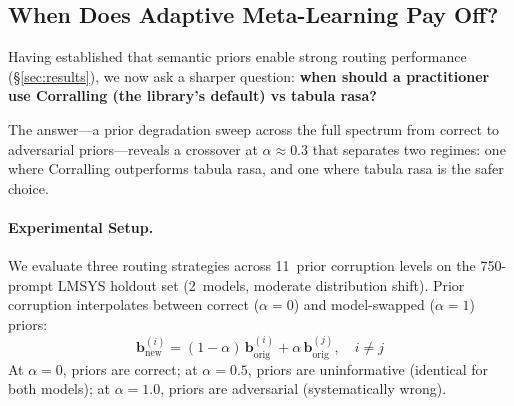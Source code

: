 
\providecommand{\CrossoverWC}{0.30}

\subsection{When Does Adaptive Meta-Learning Pay Off?}
\label{sec:metalearning_cost}

Having established that semantic priors enable strong routing
performance (\S\ref{sec:results}), we now ask a sharper question:
\textbf{when should a practitioner use Corralling (the library's
default) vs tabula rasa?}

The answer---a prior degradation sweep across the full spectrum from
correct to adversarial priors---reveals a crossover at
$\alpha{\approx}0.3$ that separates two regimes: one where Corralling
outperforms tabula rasa, and one where tabula rasa is the safer
choice.

\paragraph{Experimental Setup.}
We evaluate three routing strategies across 11~prior corruption levels
on the 750-prompt LMSYS holdout set (2~models, moderate distribution
shift).  Prior corruption interpolates between correct ($\alpha{=}0$)
and model-swapped ($\alpha{=}1$) priors:
%
\begin{equation}
    \mathbf{b}_{\text{new}}^{(i)} = (1{-}\alpha)\,\mathbf{b}_{\text{orig}}^{(i)}
    + \alpha\,\mathbf{b}_{\text{orig}}^{(j)}, \quad i \neq j
\end{equation}
%
At $\alpha{=}0$, priors are correct; at $\alpha{=}0.5$, priors are
uninformative (identical for both models); at $\alpha{=}1.0$, priors
are adversarial (systematically wrong).

